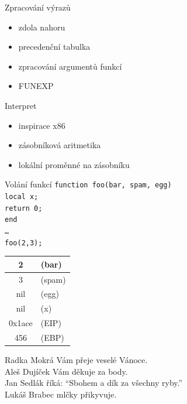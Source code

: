 \documentclass{beamer}
\begin{document}
\begin{frame}{Zpracování výrazů}
  \begin{itemize}
  \item zdola nahoru
  \item precedenční tabulka
  \item zpracování argumentů funkcí
  \item FUNEXP
  \end{itemize}
\end{frame}

\begin{frame}{Interpret}
  \begin{itemize}
  \item inspirace x86
  \item zásobníková aritmetika
  \item lokální proměnné na zásobníku
  \end{itemize}
\end{frame}

\begin{frame}{Volání funkcí}
  \tt{function foo(bar, spam, egg)\\\hspace{2em} local x;\\\hspace{2em} return 0;\\end}\\
  \ldots\\
  \tt{foo(2,3);}\\
  \begin{center}
  \begin{tabular}{|c l|}
    \hline
    2 & (bar)\\\hline
    3 & (spam)\\\hline
    nil & (egg)\\\hline
    nil & (x)\\\hline
    0x1ace & (EIP)\\\hline
    456 & (EBP)\\\hline
  \end{tabular}
  \end{center}
\end{frame}

\begin{frame}{}
  Radka Mokrá Vám přeje veselé Vánoce.\\
  Aleš Dujíček Vám děkuje za body.\\
  Jan Sedlák říká: ``Sbohem a dík za všechny ryby.''\\
  Lukáš Brabec mlčky přikyvuje.
\end{frame}
\end{document}
